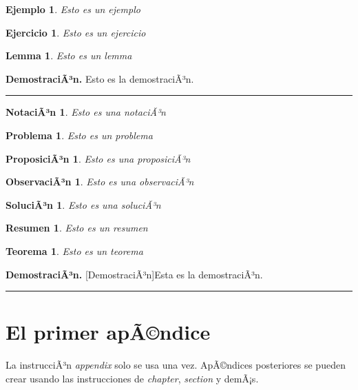 \documentclass[11pt,spanish]{report}
\newtheorem{theorem}{Teorema}[section]
\newtheorem{example}{Ejemplo}[section]
\newtheorem{exercise}{Ejercicio}[section]
\newtheorem{lemma}{Lemma}[section]
\newtheorem{notation}{NotaciÃ³n}[section]
\newtheorem{problem}{Problema}[section]
\newtheorem{proposition}{ProposiciÃ³n}[section]
\newtheorem{remark}{ObservaciÃ³n}[section]
\newtheorem{solution}{SoluciÃ³n}[section]
\newtheorem{summary}{Resumen}[section]
\newenvironment{proof}[1][DemostraciÃ³n]{\textbf{#1.} }{\ \rule{0.5em}{0.5em}}
\begin{document}
\begin{example}
Esto es un ejemplo
\end{example}

\begin{exercise}
Esto es un ejercicio
\end{exercise}

\begin{lemma}
Esto es un lemma
\end{lemma}

\begin{proof}
Esto es la demostraciÃ³n.
\end{proof}

\begin{notation}
Esto es una notaciÃ³n
\end{notation}

\begin{problem}
Esto es un problema
\end{problem}

\begin{proposition}
Esto es una proposiciÃ³n
\end{proposition}

\begin{remark}
Esto es una observaciÃ³n
\end{remark}

\begin{solution}
Esto es una soluciÃ³n
\end{solution}

\begin{summary}
Esto es un resumen
\end{summary}

\begin{theorem}
Esto es un teorema
\end{theorem}

\begin{proof}
[DemostraciÃ³n]Esta es la demostraciÃ³n.
\end{proof}

\appendix 

\chapter{El primer apÃ©ndice}

La instrucciÃ³n \emph{appendix} solo se usa una vez. ApÃ©ndices posteriores se pueden crear usando las instrucciones de \emph{chapter}, \emph{section} y demÃ¡s.



\end{document}
